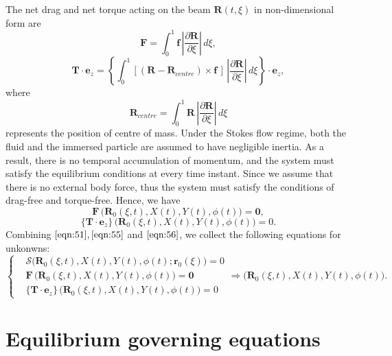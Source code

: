 \documentclass[a4paper,12pt]{report}
\begin{document}
The net drag and net torque acting on the beam $\mathbf{R}(t,\xi)$ in non-dimensional form are 
\begin{equation}
	\label{eqn:52}
	\mathbf{F}=\int^1_0 \mathbf{f}\, \left|\frac{\partial\mathbf{R}}{\partial\xi}\right|\,d\xi, 
\end{equation}
\begin{equation}
	\label{eqn:53}
	\mathbf{T}\cdot\mathbf{e}_z=\left\{\int^1_0 \left[(\mathbf{R}-\mathbf{R}_{centre})\times \mathbf{f}\,\right]\,\left|\frac{\partial\mathbf{R}}{\partial\xi}\right|\,d\xi\right\}\cdot\mathbf{e}_z,
\end{equation}
where 
\begin{equation}
	\label{eqn:54}
	\mathbf{R}_{centre}=\int^1_0 \mathbf{R}\,\left|\frac{\partial\mathbf{R}}{\partial\xi}\right|\,d\xi
\end{equation}
represents the position of centre of mass. Under the Stokes flow regime, both the fluid and the immersed particle are assumed to have negligible inertia. As a result, there is no temporal accumulation of momentum, and the system must satisfy the equilibrium conditions at every time instant. Since we assume that there is no external body force, thus the system must satisfy the conditions of drag-free and torque-free. Hence, we have 
\begin{equation}
	\label{eqn:55}
	\mathbf{F}\,\Big(\mathbf{R}_0(\xi,t), X(t), Y(t), \phi(t)\Big)=\mathbf{0},
\end{equation}
\begin{equation}
	\label{eqn:56}
	\{\mathbf{T}\cdot\mathbf{e}_z\}\,\Big(\mathbf{R}_0(\xi,t), X(t), Y(t), \phi(t)\Big)=0.
\end{equation} 
Combining $\eqref{eqn:51}, \eqref{eqn:55}$ and $\eqref{eqn:56}$, we collect the following equations for unkonwns:
\begin{equation}
	\label{eqn:57}
	\left\{\begin{aligned}
		&\mathbf{\mathcal{S}}\Big(\mathbf{R}_0(\xi,t), X(t), Y(t),\phi(t);\mathbf{r}_0(\xi)\Big)=0\\
		&\mathbf{F}\,\Big(\mathbf{R}_0(\xi,t), X(t), Y(t),\phi(t)\Big)=\mathbf{0}\\
		&\{\mathbf{T}\cdot\mathbf{e}_z\}\,\Big(\mathbf{R}_0(\xi,t), X(t), Y(t),\phi(t)\Big)=0
	\end{aligned}\right.\Longrightarrow \Big(\mathbf{R}_0(\xi,t), X(t), Y(t),\phi(t)\Big).
\end{equation}

\section{Equilibrium governing equations}
\end{document}
